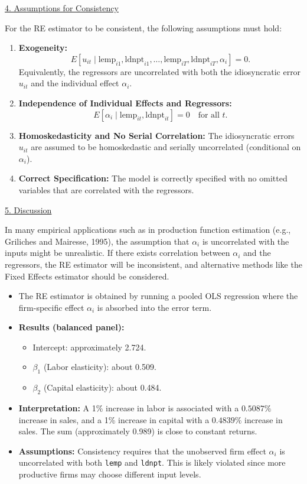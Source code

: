 \documentclass[a4paper,12pt]{article} %
\theoremstyle{nonitalic}
\newenvironment{solution}[1]
  {\renewcommand\theinnercustomsol{#1}\innercustomsol}
  {\endinnercustomsol}
\newcounter{solutionctr}
\renewcommand{\thesolutionctr}{(\alph{solutionctr})}
\newenvironment{autosolution}
  {\stepcounter{solutionctr}\begin{solution}{\thesolutionctr}}
  {\end{solution}}
\begin{document}
\begin{autosolution}
\underline{4. Assumptions for Consistency}

For the RE estimator to be consistent, the following assumptions must hold:
\begin{enumerate}
    \item \textbf{Exogeneity:} 
    \[
    E\left[u_{it} \mid \text{lemp}_{i1}, \text{ldnpt}_{i1}, \dots, \text{lemp}_{iT}, \text{ldnpt}_{iT}, \alpha_i\right] = 0.
    \]
    Equivalently, the regressors are uncorrelated with both the idiosyncratic error $u_{it}$ and the individual effect $\alpha_i$.
    
    \item \textbf{Independence of Individual Effects and Regressors:}
    \[
    E\left[\alpha_i \mid \text{lemp}_{it}, \text{ldnpt}_{it}\right] = 0 \quad \text{for all } t.
    \]
    
    \item \textbf{Homoskedasticity and No Serial Correlation:}  
    The idiosyncratic errors $u_{it}$ are assumed to be homoskedastic and serially uncorrelated (conditional on $\alpha_i$).
    
    \item \textbf{Correct Specification:}  
    The model is correctly specified with no omitted variables that are correlated with the regressors.
\end{enumerate}

\underline{5. Discussion}

In many empirical applications such as in production function estimation (e.g., Griliches and Mairesse, 1995), the assumption that $\alpha_i$ is uncorrelated with the inputs might be unrealistic. If there exists correlation between $\alpha_i$ and the regressors, the RE estimator will be inconsistent, and alternative methods like the Fixed Effects estimator should be considered.

\begin{itemize}
    \item The RE estimator is obtained by running a pooled OLS regression where the firm-specific effect $\alpha_i$ is absorbed into the error term.
    \item \textbf{Results (balanced panel):}
    
    \begin{itemize}
        \item Intercept: approximately 2.724.
        \item $\beta_1$ (Labor elasticity): about 0.509.
        \item $\beta_2$ (Capital elasticity): about 0.484.
    \end{itemize}
    \item \textbf{Interpretation:} A 1\% increase in labor is associated with a $0.5087\%$ increase in sales, and a 1\% increase in capital with a $0.4839\%$ increase in sales. The sum (approximately 0.989) is close to constant returns.
    \item \textbf{Assumptions:} Consistency requires that the unobserved firm effect $\alpha_i$ is uncorrelated with both \texttt{lemp} and \texttt{ldnpt}. This is likely violated since more productive firms may choose different input levels.
\end{itemize}


\end{autosolution}
\end{document}
